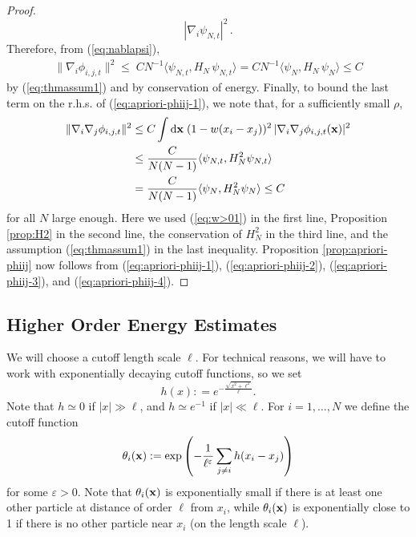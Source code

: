 \documentclass[11pt]{article}
\newcommand{\rd}{{\rm d}}
\newcommand{\eps}{\varepsilon}
\newcommand{\bx}{{\bf x}}
\begin{document}
\begin{proof}
\begin{equation}
|\nabla_i \psi_{N,t}|^2 \, .
\end{equation}
Therefore, from (\ref{eq:nablapsi}),
\begin{equation}\label{eq:apriori-phiij-3}
\begin{split}
\| \nabla_i \phi_{i,j,t} \|^2 \leq \; C N^{-1} \langle \psi_{N,t} ,
H_N \, \psi_{N,t} \rangle = C N^{-1} \langle \psi_N, H_N \, \psi_N
\rangle \leq C
\end{split}
\end{equation}
by (\ref{eq:thmassum1}) and by conservation of energy.
 Finally, to bound the last term on the
r.h.s. of (\ref{eq:apriori-phiij-1}), we note that, for a
sufficiently small $\rho$,
\begin{equation}\label{eq:apriori-phiij-4}
\begin{split}
\| \nabla_i \nabla_j \phi_{i,j,t}\|^2 \leq \; &C \int \rd \bx\;
(1-w(x_i -x_j))^2 \, |\nabla_i \nabla_j \phi_{i,j,t} (\bx)|^2 \\
\leq \; &\frac{C}{N(N-1)} \langle \psi_{N,t} , H_N^2  \psi_{N,t}
\rangle  \\ = \;& \frac{C}{N(N-1)} \langle \psi_{N} , H_N^2 \psi_{N}
\rangle \leq C
\end{split}
\end{equation}
for all $N$ large enough. Here we used (\ref{eq:w>01}) in the first
line, Proposition \ref{prop:H2} in the second line, the conservation
of $H_N^2$ in the third line, and the assumption
(\ref{eq:thmassum1}) in the last inequality. Proposition
\ref{prop:apriori-phiij} now follows from
(\ref{eq:apriori-phiij-1}), (\ref{eq:apriori-phiij-2}),
(\ref{eq:apriori-phiij-3}), and (\ref{eq:apriori-phiij-4}).
\end{proof}


\subsection{Higher Order Energy Estimates}

We will choose a cutoff length scale $\ell$. For technical reasons,
we will have to work with exponentially decaying cutoff functions,
so we set
\begin{equation}\label{eq:hdef}
h (x): = e^{-\frac{\sqrt{x^2 + \ell^2}}{\ell}}.
\end{equation}
Note that $h \simeq 0$ if $|x| \gg \ell$, and $h \simeq e^{-1}$ if
$|x| \ll \ell$. For $i=1,\dots ,N$ we define the cutoff function
\begin{equation}
\theta_i (\bx) := \exp \left(-\frac{1}{\ell^{\eps}} \sum_{j\neq i} h
(x_i -x_j)\right)
\end{equation}
for some $\eps >0$. Note that  $\theta_i(\bx)$
is exponentially small if
there is at least one other particle at distance of order $\ell$
from $x_i$, while $\theta_i(\bx)$ is exponentially close to 1
 if there is no other particle
near $x_i$ (on the length scale $\ell$).
\end{document}
